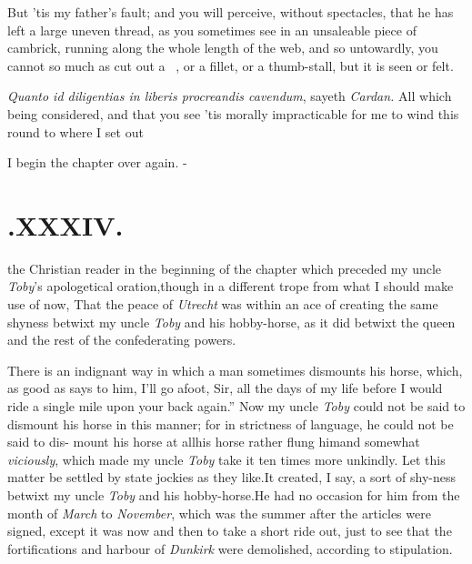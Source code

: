 \documentclass{article}
\begin{document}
\tsh But ’tis my father’s fault; and\break
{}\break you will perceive, without
spectacles, that he has left a large uneven thread, as you
sometimes see in an unsaleable piece of cambrick, running along the
whole length of the web, and so untowardly, you cannot so much as
cut out a \lower-2pt\hbox{\small\ast\ \ast},\break
{}\break
\tsh or a fillet, or a thumb-stall, but it\break
is seen or felt.\tsh

\textit{Quanto id diligentias in liberis procreandis cavendum},
sayeth \textit{Cardan.} All which being considered, and that you see
’tis morally impracticable for me to wind this round to
where I set out\tsh

I begin the chapter over again.
\vfill{}\eject
\null\kern-\baselineskip
\section{.\enspace XXXIV.}

 the Christian reader in the beginning of the chapter which
preceded my uncle \textit{Toby}’s apologetical oration,\tsk though in a different
trope from what I should make use of now, That the peace of \textit{Utrecht} was
within an ace of creating the same shyness betwixt my uncle \textit{Toby} and his
hobby-horse, as it did betwixt the queen and the rest of the confederating powers.

There is an indignant way in which a\break
man sometimes dismounts his horse,\break
which, as good as says to him, \lqq I’ll go\break
\lqq afoot, Sir, all the days of my life\break
\lqq before I would ride a single mile upon\break
\lqq your back again.” Now my uncle\break
\textit{Toby} could not be said to dismount his\break
horse in this manner; for in strictness of\break
language, he could not be said to dis- mount his horse at all\tsh his horse rather flung him\tsh and
somewhat \textit{viciously}, which made my uncle \textit{Toby} take it ten times
more unkindly. Let this\break
matter be settled by state jockies as they like.\tsh It
created, I say, a sort of shy-\break ness betwixt my uncle \textit{Toby} and his
hobby-horse.\tsh He had no occasion for him from the month of \textit{March} to
\textit{November}, which was the summer after the articles were signed, except it
was now and then to take a short ride out, just to see that the fortifications and
harbour of \textit{Dunkirk} were demolished, according to stipulation.
\end{document}
